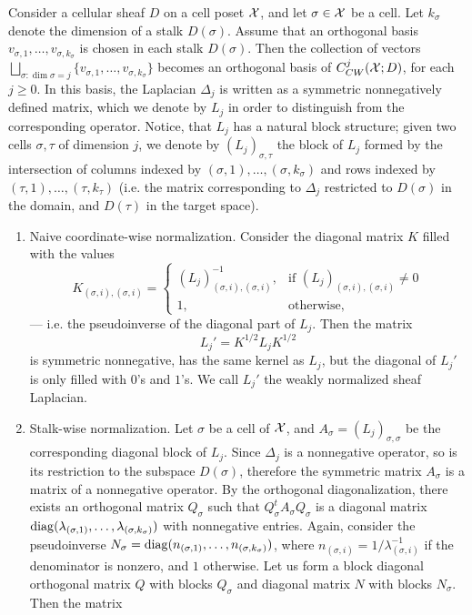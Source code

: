 \begin{con}\label{conNormalizationOfLaplacian}
Consider a cellular sheaf $D$ on a cell poset $\mathcal{X}$, and let $\sigma\in\mathcal{X}$ be a cell. Let $k_\sigma$ denote the dimension of a stalk $D(\sigma)$. Assume that an orthogonal basis $v_{\sigma,1},\ldots,v_{\sigma,k_\sigma}$ is chosen in each stalk $D(\sigma)$. Then the collection of vectors $\bigsqcup_{\sigma\colon \dim\sigma=j}\{v_{\sigma,1},\ldots,v_{\sigma,k_\sigma}\}$ becomes an orthogonal basis of $C^j_{CW}(\mathcal{X};D)$, for each $j\geq 0$. In this basis, the Laplacian $\Delta_j$ is written as a symmetric nonnegatively defined matrix, which we denote by $L_j$ in order to distinguish from the corresponding operator. Notice, that $L_j$ has a natural block structure; given two cells $\sigma,\tau$ of dimension $j$, we denote by $(L_j)_{\sigma,\tau}$ the block of $L_j$ formed by the intersection of columns indexed by $(\sigma,1),\ldots,(\sigma,k_\sigma)$ and rows indexed by $(\tau,1),\ldots,(\tau,k_\tau)$ (i.e. the matrix corresponding to $\Delta_j$ restricted to $D(\sigma)$ in the domain, and $D(\tau)$ in the target space).
\begin{enumerate}
  \item Naive coordinate-wise normalization. Consider the diagonal matrix $K$ filled with the values
  \[
  K_{(\sigma,i),(\sigma,i)}=\begin{cases}
                              (L_j)_{(\sigma,i),(\sigma,i)}^{-1}, & \mbox{if } (L_j)_{(\sigma,i),(\sigma,i)}\neq 0 \\
                              1, & \mbox{otherwise},
                            \end{cases}
  \]
  --- i.e. the pseudoinverse of the diagonal part of $L_j$. Then the matrix
  \begin{equation}\label{eqWeaklyNormalized}
    L_j'=K^{1/2}L_jK^{1/2}
  \end{equation}
  is symmetric nonnegative, has the same kernel as $L_j$, but the diagonal of $L_j'$ is only filled with $0$'s and $1$'s. We call $L_j'$ the weakly normalized sheaf Laplacian.
  \item Stalk-wise normalization. Let $\sigma$ be a cell of $\mathcal{X}$, and $A_\sigma=(L_j)_{\sigma,\sigma}$ be the corresponding diagonal block of $L_j$. Since $\Delta_j$ is a nonnegative operator, so is its restriction to the subspace $D(\sigma)$, therefore the symmetric matrix $A_\sigma$ is a matrix of a nonnegative operator. By the orthogonal diagonalization, there exists an orthogonal matrix $Q_\sigma$ such that $Q_\sigma^tA_\sigma Q_\sigma$ is a diagonal matrix $\operatorname{diag}(\lambda_{(\sigma,1)},\ldots,\lambda_{(\sigma,k_\sigma)})$ with nonnegative entries. Again, consider the pseudoinverse $N_\sigma=\operatorname{diag}(n_{(\sigma,1)},\ldots, n_{(\sigma,k_\sigma)})$, where $n_{(\sigma,i)}=1/\lambda_{(\sigma,i)}^{-1}$ if the denominator is nonzero, and $1$ otherwise. Let us form a block diagonal orthogonal matrix $Q$ with blocks $Q_\sigma$ and diagonal matrix $N$ with blocks $N_\sigma$. Then the matrix

\end{enumerate}
\end{con}
